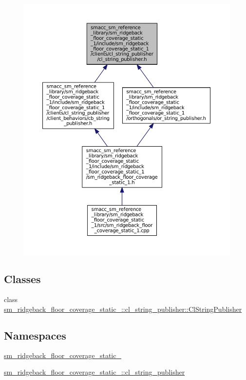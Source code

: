 \begin{figure}[H]
\begin{center}
\leavevmode
\includegraphics[width=350pt]{sm__ridgeback__floor__coverage__static__1_2include_2sm__ridgeback__floor__coverage__static__1_2cb2c5c8e03ebb24fe038636113e9c730a}
\end{center}
\end{figure}
\subsection*{Classes}
\begin{DoxyCompactItemize}
\item 
class \hyperlink{classsm__ridgeback__floor__coverage__static__1_1_1cl__string__publisher_1_1ClStringPublisher}{sm\+\_\+ridgeback\+\_\+floor\+\_\+coverage\+\_\+static\+\_\+::cl\+\_\+string\+\_\+publisher\+::\+Cl\+String\+Publisher}
\end{DoxyCompactItemize}
\subsection*{Namespaces}
\begin{DoxyCompactItemize}
\item 
 \hyperlink{namespacesm__ridgeback__floor__coverage__static__1}{sm\+\_\+ridgeback\+\_\+floor\+\_\+coverage\+\_\+static\+\_}
\item 
 \hyperlink{namespacesm__ridgeback__floor__coverage__static__1_1_1cl__string__publisher}{sm\+\_\+ridgeback\+\_\+floor\+\_\+coverage\+\_\+static\+\_\+::cl\+\_\+string\+\_\+publisher}
\end{DoxyCompactItemize}
